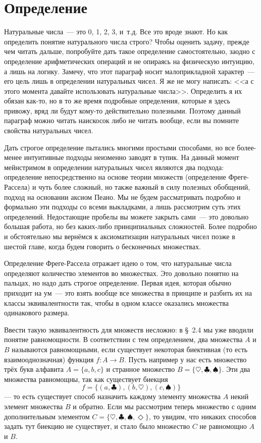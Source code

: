 \section{Определение}

Натуральные числа~--- это 0, 1, 2, 3, и~т.д. Все это вроде знают. Но как определить понятие натурального числа строго? Чтобы оценить задачу, прежде чем читать дальше, попробуйте дать такое определение самостоятельно, заодно с определение арифметических операций и не опираясь на физическую интуицию, а лишь на логику. Замечу, что этот параграф носит малоприкладной характер~--- его цель лишь в определении натуральных чисел. Я же не могу написать: <<а с этого момента давайте использовать натуральные числа>>. Определить я их обязан как-то, но в то же время подробные определения, которые я здесь привожу, вряд ли будут кому-то действительно полезными. Поэтому данный параграф можно читать наискосок либо не читать вообще, если вы помните свойства натуральных чисел.

Дать строгое определение пытались многими простыми способами, но все более-менее интуитивные подходы неизменно заводят в тупик. На данный момент мейнстримом в определении натуральных чисел являются два подхода: определение непосредственно на основе теории множеств (определение Фреге-Рассела) и чуть более сложный, но также важный в силу полезных обобщений, подход на основании аксиом Пеано. Мы не будем рассматривать подробно и формально эти подходы со всеми выкладками, а лишь рассмотрим суть этих определений. Недостающие пробелы вы можете закрыть сами~--- это довольно большая работа, но без каких-либо принципиальных сложностей. Более подробно и обстоятельно мы вернёмся к аксиоматизации натуральных чисел позже в шестой главе, когда будем говорить о бесконечных множествах.

Определение Фреге-Рассела отражает идею о том, что натуральные числа определяют количество элементов во множествах. Это довольно понятно на пальцах, но надо дать строгое определение. Первая идея, которая обычно приходит на ум~--- это взять вообще все множества в принципе и разбить их на классы эквивалентности так, чтобы в одном классе оказались множества одинакового размера.

Ввести такую эквивалентность для множеств несложно: в \S~2.4 мы уже вводили понятие равномощности. В соответствии с тем определением, два множества $A$ и $B$ называются равномощными, если существует некоторая биективная (то есть взаимооднозначная) функция $f:A\to B$. Пусть например у нас есть множество трёх букв алфавита $A=\{a, b, c\}$ и странное множество $B=\{\heartsuit, \clubsuit, \spadesuit\}$. Эти два множества равномощны, так как существует биекция $$f=\{(a, \clubsuit), (b, \heartsuit), (c, \spadesuit)\}$$ --- то есть существует способ назначить каждому элементу множества $A$ некий элемент множества $B$ и обратно. Если мы рассмотрим теперь множество с одним дополнительным элементом $C=\{\heartsuit, \clubsuit, \spadesuit, \Diamond\}$, то увидим, что никаких способов задать тут биекцию не существует, и стало было множество $C$ не равномощно $A$ и $B$.

